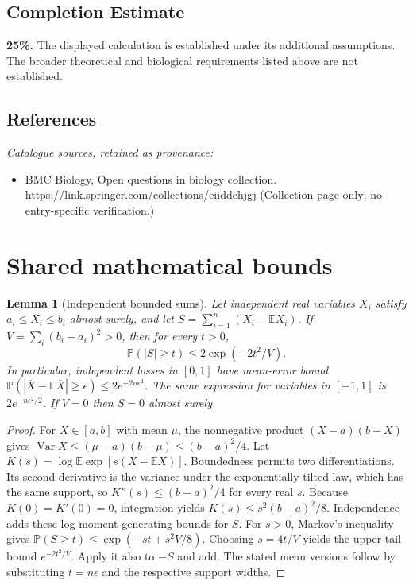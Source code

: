 \documentclass[11pt]{article}
\newcommand{\E}{\mathbb E}
\newcommand{\Prob}{\mathbb P}
\DeclareMathOperator{\Var}{Var}
\providecommand{\E}{\mathbb E}
\providecommand{\Prob}{\mathbb P}
\providecommand{\Var}{\operatorname{Var}}
\newtheorem{sharedlemma}{Lemma}[section]
\begin{document}
\subsection{Completion Estimate}
\textbf{25\%.} The displayed calculation is established under its additional assumptions. The broader theoretical and biological requirements listed above are not established.
\subsection{References}
\noindent\emph{Catalogue sources, retained as provenance:}
\begin{itemize}
\item BMC Biology, Open questions in biology collection. \url{https://link.springer.com/collections/eiiddehjgj} (Collection page only; no entry-specific verification.)
\end{itemize}
\clearpage


\appendix
\section{Shared mathematical bounds}\label{app:bounds}
\begin{sharedlemma}[Independent bounded sums]\label{lem:bounded}
Let independent real variables $X_i$ satisfy $a_i\leq X_i\leq b_i$ almost surely,
and let $S=\sum_{i=1}^n(X_i-\E X_i)$. If
$V=\sum_i(b_i-a_i)^2>0$, then for every $t>0$,
\[
 \Prob(|S|\geq t)\leq 2\exp(-2t^2/V).
\]
In particular, independent losses in $[0,1]$ have mean-error bound
$\Prob(|\overline X-\E\overline X|\geq\epsilon)
\leq2e^{-2n\epsilon^2}$. The same expression for variables in $[-1,1]$
is $2e^{-n\epsilon^2/2}$. If $V=0$ then $S=0$ almost surely.
\end{sharedlemma}
\begin{proof}
For $X\in[a,b]$ with mean $\mu$, the nonnegative product
$(X-a)(b-X)$ gives
$\Var X\leq(\mu-a)(b-\mu)\leq(b-a)^2/4$.
Let $K(s)=\log\E\exp[s(X-\E X)]$.
Boundedness permits two differentiations. Its second derivative is the variance
under the exponentially tilted law, which has the same support, so
$K''(s)\leq(b-a)^2/4$ for every real $s$.
Because $K(0)=K'(0)=0$, integration yields
$K(s)\leq s^2(b-a)^2/8$.
Independence adds these log moment-generating bounds for $S$.
For $s>0$, Markov's inequality gives
$\Prob(S\geq t)\leq\exp(-st+s^2V/8)$.
Choosing $s=4t/V$ yields the upper-tail bound $e^{-2t^2/V}$.
Apply it also to $-S$ and add. The stated mean versions follow by substituting
$t=n\epsilon$ and the respective support widths.
\end{proof}
\end{document}

